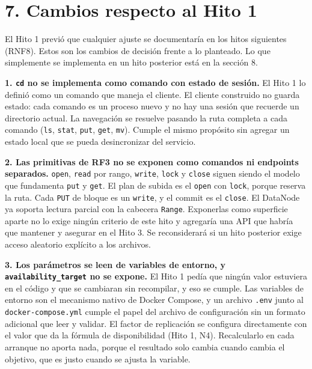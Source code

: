 \documentclass[10pt]{article}
\begin{document}
\separador

\section{7. Cambios respecto al Hito 1}

El Hito 1 previó que cualquier ajuste se documentaría en los hitos siguientes (RNF8). Estos son los cambios de decisión frente a lo planteado. Lo que simplemente se implementa en un hito posterior está en la sección 8.

\textbf{1. \texttt{cd} no se implementa como comando con estado de sesión.} El Hito 1 lo definió como un comando que maneja el cliente. El cliente construido no guarda estado: cada comando es un proceso nuevo y no hay una sesión que recuerde un directorio actual. La navegación se resuelve pasando la ruta completa a cada comando (\texttt{ls}, \texttt{stat}, \texttt{put}, \texttt{get}, \texttt{mv}). Cumple el mismo propósito sin agregar un estado local que se pueda desincronizar del servicio.

\textbf{2. Las primitivas de RF3 no se exponen como comandos ni endpoints separados.} \texttt{open}, \texttt{read} por rango, \texttt{write}, \texttt{lock} y \texttt{close} siguen siendo el modelo que fundamenta \texttt{put} y \texttt{get}. El plan de subida es el \texttt{open} con \texttt{lock}, porque reserva la ruta. Cada \texttt{PUT} de bloque es un \texttt{write}, y el commit es el \texttt{close}. El DataNode ya soporta lectura parcial con la cabecera \texttt{Range}. Exponerlas como superficie aparte no lo exige ningún criterio de este hito y agregaría una API que habría que mantener y asegurar en el Hito 3. Se reconsiderará si un hito posterior exige acceso aleatorio explícito a los archivos.

\textbf{3. Los parámetros se leen de variables de entorno, y \texttt{availability\_target} no se expone.} El Hito 1 pedía que ningún valor estuviera en el código y que se cambiaran sin recompilar, y eso se cumple. Las variables de entorno son el mecanismo nativo de Docker Compose, y un archivo \texttt{.env} junto al \texttt{docker-compose.yml} cumple el papel del archivo de configuración sin un formato adicional que leer y validar. El factor de replicación se configura directamente con el valor que da la fórmula de disponibilidad (Hito 1, N4). Recalcularlo en cada arranque no aporta nada, porque el resultado solo cambia cuando cambia el objetivo, que es justo cuando se ajusta la variable.
\end{document}
